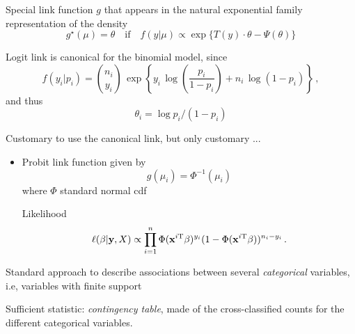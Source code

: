 \begin{slide}
Special link function $g$ that appears in the natural exponential family representation of the density
$$
g^\star(\mu)=\theta
\quad \text{if}\quad f(y|\mu)
\propto \exp \{T(y)\cdot\theta-\Psi(\theta)\}
$$

\pause
\begin{example}Logit link is canonical for the binomial model, since
$$
f(y_i|p_i) = {n_i \choose y_i}\,\exp\left\{ y_i\,\log\left( \frac{p_i}{1-p_i}\right)+n_i\,\log(1-p_i)\right\}\,, 
$$
and thus
$$
\theta_i = \log p_i/(1-p_i)
$$\end{example}

\end{slide}\begin{slide}[label=Probex]

Customary to use the canonical link, but only customary ...

\begin{itemize}
\item {}

Probit link function given by
$$
g(\mu_i)=\Phi^{-1}(\mu_i)
$$
where $\Phi$ standard normal cdf

Likelihood
$$
\ell(\beta|\mathbf{y},X)\propto \prod_{i=1}^n \Phi(\mathbf{x}^{i\mathrm{T}}\beta)^{y_i} (1-\Phi(\mathbf{x}^{i\mathrm{T}}\beta))^{n_i-y_i}\,.
$$

\end{itemize}\hyperlink{Proful}{}

\end{slide}\begin{slide}[label=LLintro]

Standard approach to describe associations between several {\em categorical} 
variables, i.e, variables with finite support
 
Sufficient statistic: {\em contingency table}, made of the
cross-classified counts for the different categorical 
variables.\hyperlink{LLmdL}{}

\pause\footnotesize
\begin{example}
{\footnotesize{\tt{}}}
\end{example}\normalsize



\end{slide}
